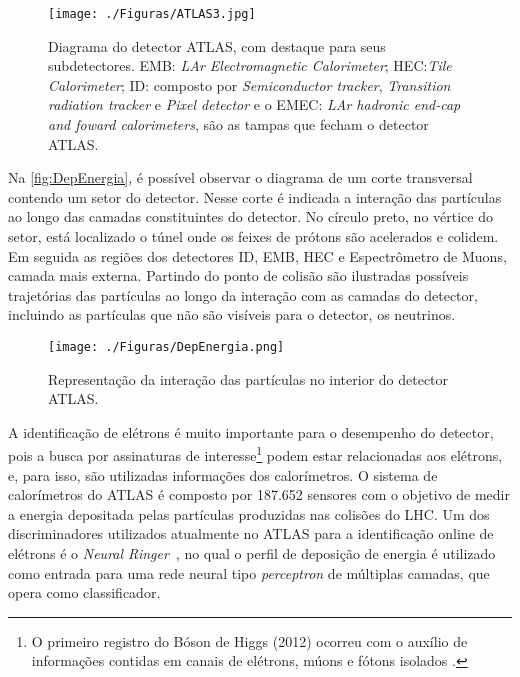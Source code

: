 \begin{figure}[H]
	\begin{center}
		\caption{Diagrama do detector ATLAS, com destaque para seus subdetectores. EMB: \textit{LAr Electromagnetic Calorimeter}; HEC:\textit{Tile Calorimeter}; ID: composto por \textit{Semiconductor tracker}, \textit{Transition radiation tracker} e \textit{Pixel detector} e o EMEC: \textit{LAr hadronic end-cap and foward calorimeters}, são as tampas que fecham o detector ATLAS. }
		\texttt{[image: ./Figuras/ATLAS3.jpg]}
		\label{fig:atlas}
	\end{center}
\end{figure}

Na \autoref{fig:DepEnergia}, é possível observar o diagrama de um corte transversal contendo um setor do detector. Nesse corte é indicada  a interação das partículas ao longo das camadas constituintes do detector. No círculo preto, no vértice do setor, está localizado o túnel onde os feixes de prótons são acelerados e colidem. Em seguida as regiões dos detectores ID, EMB, HEC e Espectrômetro de Muons, camada mais externa. Partindo do ponto de colisão são ilustradas possíveis trajetórias das partículas ao longo da interação com as camadas do detector, incluindo as partículas que não são visíveis para o detector, os neutrinos. 

\begin{figure}[H]
	\begin{center}
		\caption{Representação da interação das partículas no interior do detector ATLAS.}
		\texttt{[image: ./Figuras/DepEnergia.png]}
		\label{fig:DepEnergia}
	\end{center}
\end{figure}

A identificação de elétrons é muito importante para o desempenho do detector, pois a busca por assinaturas de interesse\footnote{O primeiro registro do Bóson de Higgs (2012) ocorreu com o auxílio de informações contidas em canais de elétrons, múons e fótons isolados \cite{werner2016}.} podem estar relacionadas aos elétrons, e, para isso, são utilizadas informações dos calorímetros.  O sistema de calorímetros do ATLAS é composto por 187.652 sensores \cite{atlas2017} com o objetivo de medir a energia depositada pelas partículas produzidas nas colisões do LHC. Um dos discriminadores utilizados atualmente no ATLAS para a identificação online de elétrons é o \textit{Neural Ringer}~\cite{seixas1996}, no qual o perfil de deposição de energia é utilizado como entrada para uma rede neural tipo \emph{perceptron} de múltiplas camadas, que opera como classificador.

